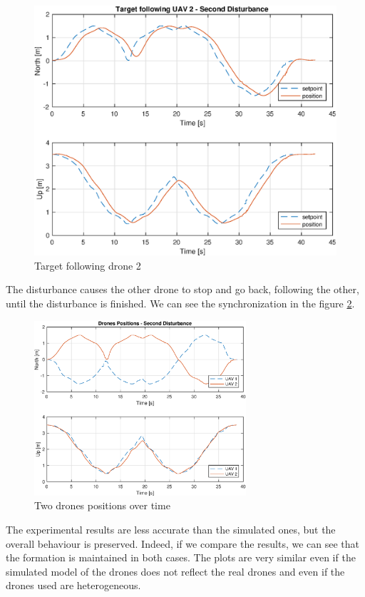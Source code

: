 \begin{figure}
\centering
\includegraphics[width=0.7\linewidth]{chapters/chapter-05/figures/following_2_2.eps}
\caption{Target following drone 2}
\label{fig:exp_following_2_2}
\end{figure}

The disturbance causes the other drone to stop and go back, following the other,
until the disturbance is finished.
We can see the synchronization in the figure \ref{fig:exp_overlapped_2}.

\begin{figure}
\centering
\includegraphics[width=0.7\textwidth]{chapters/chapter-05/figures/overlapped_2.eps}
\caption{Two drones positions over time}
\label{fig:exp_overlapped_2}
\end{figure}

The experimental results are less accurate than the simulated ones,
but the overall behaviour is preserved. Indeed, if we compare the results, we
can see that the formation is maintained in both cases. The plots are very similar
even if the simulated model of the drones does not reflect the real drones and even if
the drones used are heterogeneous.
